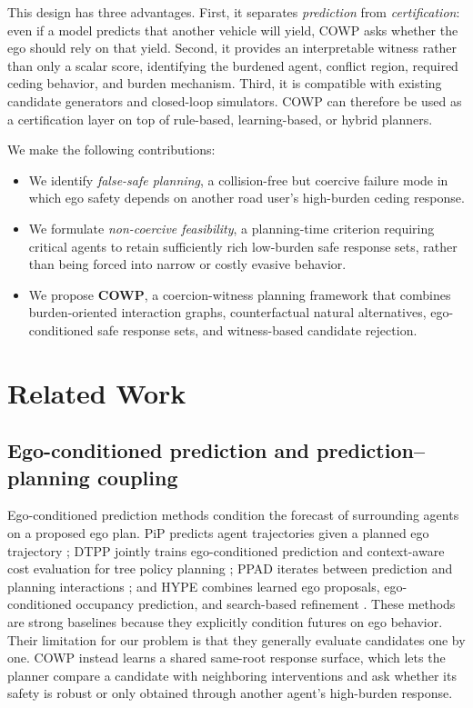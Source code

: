 \documentclass[10pt]{article}
\newcommand{\framework}{COWP}
\begin{document}
This design has three advantages. First, it separates \emph{prediction} from \emph{certification}: even if a model predicts that another vehicle will yield, COWP asks whether the ego should rely on that yield. Second, it provides an interpretable witness rather than only a scalar score, identifying the burdened agent, conflict region, required ceding behavior, and burden mechanism. Third, it is compatible with existing candidate generators and closed-loop simulators. COWP can therefore be used as a certification layer on top of rule-based, learning-based, or hybrid planners.

We make the following contributions: \begin{itemize} 
\item We identify \emph{false-safe planning}, a collision-free but coercive failure mode in which ego safety depends on another road user's high-burden ceding response. 
\item We formulate \emph{non-coercive feasibility}, a planning-time criterion requiring critical agents to retain sufficiently rich low-burden safe response sets, rather than being forced into narrow or costly evasive behavior. 
\item We propose \textbf{COWP}, a coercion-witness planning framework that combines burden-oriented interaction graphs, counterfactual natural alternatives, ego-conditioned safe response sets, and witness-based candidate rejection. \end{itemize}


\section{Related Work}

\subsection{Ego-conditioned prediction and prediction--planning coupling}
Ego-conditioned prediction methods condition the forecast of surrounding agents on a proposed ego plan. PiP predicts agent trajectories given a planned ego trajectory \parencite{song2020pip}; DTPP jointly trains ego-conditioned prediction and context-aware cost evaluation for tree policy planning \parencite{huang2024dtpp}; PPAD iterates between prediction and planning interactions \parencite{chen2024ppad}; and HYPE combines learned ego proposals, ego-conditioned occupancy prediction, and search-based refinement \parencite{yu2025hype}. These methods are strong baselines because they explicitly condition futures on ego behavior. Their limitation for our problem is that they generally evaluate candidates one by one. \framework{} instead learns a shared same-root response surface, which lets the planner compare a candidate with neighboring interventions and ask whether its safety is robust or only obtained through another agent's high-burden response.
\end{document}
